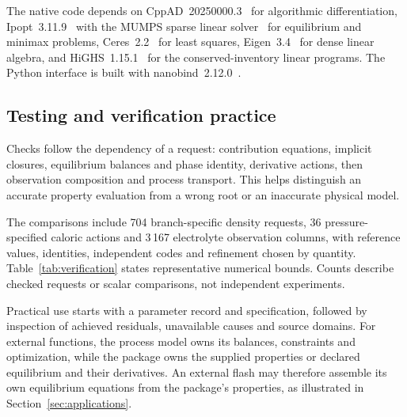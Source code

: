 The native code depends on CppAD~20250000.3~\citep{bellCppADPackageAlgorithmic2025} for algorithmic differentiation, Ipopt~3.11.9~\citep{Wachter2006} with the MUMPS sparse linear solver~\citep{amestoyFullyAsynchronousMultifrontal2001,amestoyPerformanceScalabilityBlock2019} for equilibrium and minimax problems, Ceres~2.2~\citep{agarwalCeresSolver2023} for least squares, Eigen~3.4~\citep{guennebaudEigenV32010} for dense linear algebra, and HiGHS~1.15.1~\citep{huangfuParallelizingDualRevised2018} for the conserved-inventory linear programs.
The Python interface is built with nanobind~2.12.0~\citep{jakobNanobindTinyEfficient2022}.


\subsection{Testing and verification practice}
Checks follow the dependency of a request: contribution equations, implicit closures, equilibrium balances and phase identity, derivative actions, then observation composition and process transport.
This helps distinguish an accurate property evaluation from a wrong root or an inaccurate physical model.


The comparisons include 704 branch-specific density requests, 36 pressure-specified caloric actions and 3\,167 electrolyte observation columns, with reference values, identities, independent codes and refinement chosen by quantity.
Table~\ref{tab:verification} states representative numerical bounds.
Counts describe checked requests or scalar comparisons, not independent experiments.


Practical use starts with a parameter record and specification, followed by inspection of achieved residuals, unavailable causes and source domains.
For external functions, the process model owns its balances, constraints and optimization, while the package owns the supplied properties or declared equilibrium and their derivatives.
An external flash may therefore assemble its own equilibrium equations from the package's properties, as illustrated in Section~\ref{sec:applications}.
